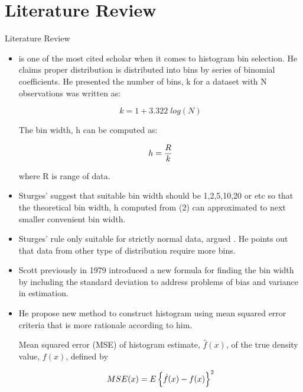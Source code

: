 \documentclass{beamer}
\begin{document}
\section{Literature Review}
\begin{frame}[allowframebreaks]{Literature Review}

\begin{itemize}
	
	\item \cite{sturges1926choice} is one of the most cited scholar when it comes to histogram bin selection. He claims proper distribution is distributed into bins by series of binomial coefficients. He presented the number of bins, k for a dataset with N observations was written as:
	
	\begin{equation}
	k= 1 + 3.322\; log(N)
	\end{equation} 
	
	The bin width, h can be computed as: 
	
	\begin{equation}
	\large{h= \frac{R}{k} } 
	\end{equation}
	
	where R is range of data.
	
	\item Sturges' suggest that suitable bin width should be 1,2,5,10,20 or etc so that the theoretical bin width, h computed from (2) can approximated to next smaller convenient bin width.
	
	\item Sturges' rule only suitable for strictly normal data, argued \cite{scott2009sturges} . He points out that data from other type of distribution require more bins.
	
	\item Scott previously in 1979 introduced a new formula for finding the bin width \cite{scott1979optimal} by including the standard deviation to address problems of bias and variance in estimation. 
	
	\item He propose new method to construct histogram using mean squared error criteria that is more rationale according to him.
	
	Mean squared error (MSE) of histogram estimate, $\hat{f}(x)$, of the true density value, $f(x)$, defined by
	
	\begin{equation}
	MSE(x)=\large E \left\{\hat{f}(x) - f(x)  \right\}^2
	\end{equation}
	

\end{itemize}
\end{frame}
\end{document}
